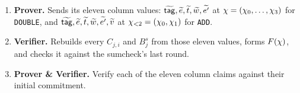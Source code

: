 \begin{enumerate}[itemsep=1pt,topsep=3pt]
They run over different cubes, $\cube{4}$ for \texttt{DOUBLE} and $\cube{2}$ for \texttt{ADD}, so \texttt{ADD}'s part is multiplied by $X_2X_3$, the two variables it does not use, whose sum over $\cube{2}$ is $1$ and so leaves its own sum untouched:
\begin{align*}
  F(X_0,\dots,X_3)&=\eq\bigl(\zeta_{<4},(X_0,\dots,X_3)\bigr)\Bigl(\xi^{0}C_{1,1}+\xi^{1}C_{1,2}+\xi^{5}B^{\push}_{1}+\xi^{6}B^{\pull}_{1}\Bigr)\\
                  &\quad+\eq\bigl(\zeta_{<2},(X_0,X_1)\bigr)\Bigl(\xi^{2}C_{2,1}+\xi^{3}C_{2,2}+\xi^{4}C_{2,3}+\xi^{5}B^{\push}_{2}+\xi^{6}B^{\pull}_{2}\Bigr)X_2X_3 .
\end{align*}
One sumcheck over $\cube{4}$ then proves all seven claims at once:
\[
  \sum_{x\in\cube{4}}F(x)\qeq\xi^{5}\mathsf{rem}_{\push}+\xi^{6}\mathsf{rem}_{\pull}.
\]
\item \textbf{Prover.} Sends its eleven column values: $\widetilde{\mathsf{tag}},\widetilde{e},\widetilde{t},\widetilde{w},\widetilde{e'}$ at $\chi=(\chi_0,\dots,\chi_3)$ for \texttt{DOUBLE}, and $\widetilde{\mathsf{tag}},\widetilde{e},\widetilde{t},\widetilde{w},\widetilde{e'},\widetilde{v}$ at $\chi_{<2}=(\chi_0,\chi_1)$ for \texttt{ADD}.
\item \textbf{Verifier.} Rebuilds every $C_{j,i}$ and $B^{s}_{j}$ from those eleven values, forms $F(\chi)$, and checks it against the sumcheck's last round.
\item \textbf{Prover \& Verifier.} Verify each of the eleven column claims against their initial commitment.
\end{enumerate}

